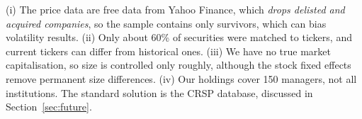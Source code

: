 \begin{caution}
(i) The price data are free data from Yahoo Finance, which \emph{drops delisted and acquired companies}, so the sample contains only survivors, which can bias volatility results. (ii) Only about 60\% of securities were matched to tickers, and current tickers can differ from historical ones. (iii) We have no true market capitalisation, so size is controlled only roughly, although the stock fixed effects remove permanent size differences. (iv) Our holdings cover 150 managers, not all institutions. The standard solution is the CRSP database, discussed in Section~\ref{sec:future}.
\end{caution}
